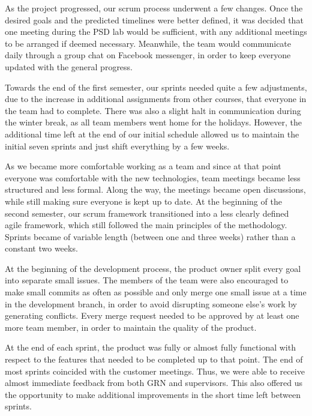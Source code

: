 \documentclass{l3proj}
\begin{document}
 As the project progressed, our scrum process underwent a few changes. Once the desired goals and the predicted timelines were better defined, it was decided that one meeting during the PSD lab would be sufficient, with any additional meetings to be arranged if deemed necessary. Meanwhile, the team would communicate daily through a group chat on Facebook messenger, in order to keep everyone updated with the general progress.
 
 Towards the end of the first semester, our sprints needed quite a few adjustments, due to the increase in additional assignments from other courses, that everyone in the team had to complete. There was also a slight halt in communication during the winter break, as all team members went home for the holidays. However, the additional time left at the end of our initial schedule allowed us to maintain the initial seven sprints and just shift everything by a few weeks.
 
 As we became more comfortable working as a team and since at that point everyone was comfortable with the new technologies, team meetings became less structured and less formal. Along the way, the meetings became open discussions, while still making sure everyone is kept up to date. At the beginning of the second semester, our scrum framework transitioned into a less clearly defined agile framework, which still followed the main principles of the methodology. Sprints became of variable length (between one and three weeks) rather than a constant two weeks.
 
 
 
 At the beginning of the development process, the product owner split every goal into separate small issues. The members of the team were also encouraged to make small commits as often as possible and only merge one small issue at a time in the development branch, in order to avoid disrupting someone else's work by generating conflicts. Every merge request needed to be approved by at least one more team member, in order to maintain the quality of the product.
 
 At the end of each sprint, the product was fully or almost fully functional with respect to the features that needed to be completed up to that point. The end of most sprints coincided with the customer meetings. Thus, we were able to receive almost immediate feedback from both GRN and supervisors. This also offered us the opportunity to make additional improvements in the short time left between sprints.
 
\end{document}
